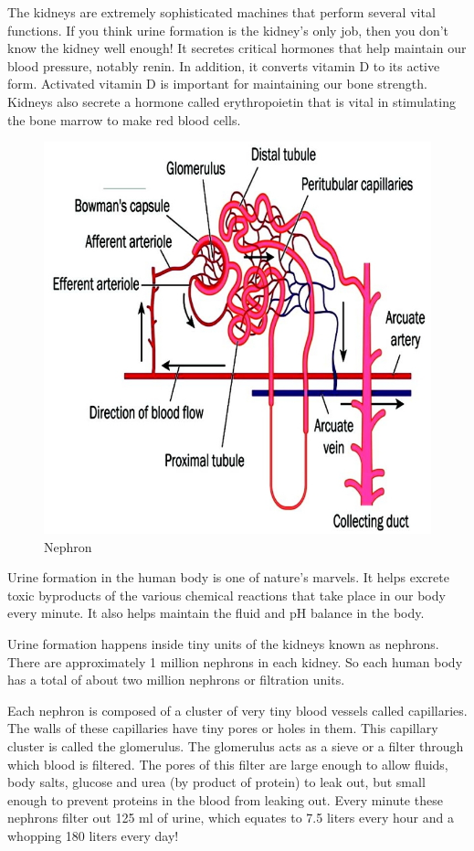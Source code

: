 {The kidneys are extremely sophisticated machines that perform several vital functions. If you think urine formation is the kidney’s only job, then you don’t know the kidney well enough! It secretes critical hormones that help maintain our blood pressure, notably renin. In addition, it converts vitamin D to its active form. Activated vitamin D is important for maintaining our bone strength. Kidneys also secrete a hormone called erythropoietin that is vital in stimulating the bone marrow to make red blood cells.

\begin{figure}
\caption{Nephron}
\includegraphics{images/046.jpg}
\end{figure}

Urine formation in the human body is one of nature’s marvels. It helps excrete toxic byproducts of the various chemical reactions that take place in our body every minute. It also helps maintain the fluid and pH balance in the body.

Urine formation happens inside tiny units of the kidneys known as nephrons. There are approximately 1 million nephrons in each kidney. So each human body has a total of about two million nephrons or filtration units.

Each nephron is composed of a cluster of very tiny blood vessels called capillaries. The walls of these capillaries have tiny pores or holes in them. This capillary cluster is called the glomerulus. The glomerulus acts as a sieve or a filter through which blood is filtered. The pores of this filter are large enough to allow fluids, body salts, glucose and urea (by product of protein) to leak out, but small enough to prevent proteins in the blood from leaking out. Every minute these nephrons filter out 125 ml of urine, which equates to 7.5 liters every hour and a whopping 180 liters every day!

}

